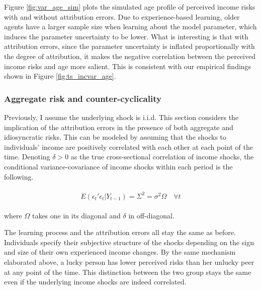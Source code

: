 \documentclass[12pt,notitlepage,onecolumn,aps,pra]{article}
\begin{document}
Figure \ref{fig:var_age_sim} plots the simulated age profile of
perceived income risks with and without attribution errors. Due to
experience-based learning, older agents have a larger sample size when
learning about the model parameter, which induces the parameter
uncertainty to be lower. What is interesting is that with attribution
errors, since the parameter uncertainty is inflated proportionally with
the degree of attribution, it makes the negative correlation between the
perceived income risks and age more salient. This is consistent with our
empirical findings shown in Figure \ref{fig:ts_incvar_age}.



    \hypertarget{aggregate-risk-and-counter-cyclicality}{%
\subsubsection{Aggregate risk and
counter-cyclicality}\label{aggregate-risk-and-counter-cyclicality}}

Previously, I assume the underlying shock is i.i.d. This section
considers the implication of the attribution errors in the presence of
both aggregate and idiosyncratic risks. This can be modeled by assuming
that the shocks to individuals' income are positively correlated with
each other at each point of the time. Denoting \(\delta>0\) as the true
cross-sectional correlation of income shocks, the conditional
variance-covariance of income shocks within each period is the
following.

\begin{eqnarray}
\begin{split}
E(\epsilon_{t}'\epsilon_{t}|Y_{t-1}) = \Sigma^2 = \sigma^2\Omega \quad \forall t  
\end{split}
\end{eqnarray}

where \(\Omega\) takes one in its diagonal and \(\delta\) in
off-diagonal.

The learning process and the attribution errors all stay the same as
before. Individuals specify their subjective structure of the shocks
depending on the sign and size of their own experienced income changes.
By the same mechanism elaborated above, a lucky person has lower
perceived risks than her unlucky peer at any point of the time. This
distinction between the two group stays the same even if the underlying
income shocks are indeed correlated.
\end{document}
